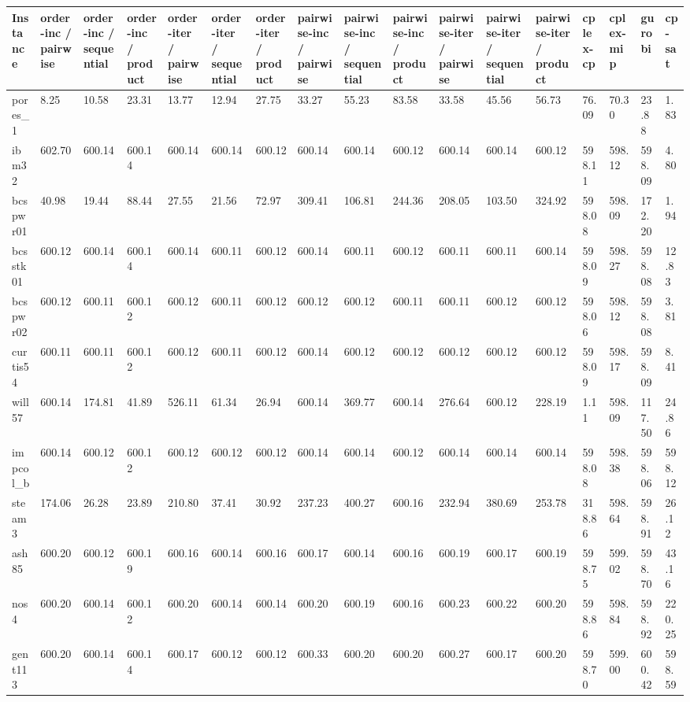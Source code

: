 \begin{tabular}{lllllllllllllllll}
\hline
Instance & order-inc / pairwise & order-inc / sequential & order-inc / product & order-iter / pairwise & order-iter / sequential & order-iter / product & pairwise-inc / pairwise & pairwise-inc / sequential & pairwise-inc / product & pairwise-iter / pairwise & pairwise-iter / sequential & pairwise-iter / product & cplex-cp & cplex-mip & gurobi & cp-sat \\
\hline
pores\_1 & 8.25 & 10.58 & 23.31 & 13.77 & 12.94 & 27.75 & 33.27 & 55.23 & 83.58 & 33.58 & 45.56 & 56.73 & 76.09 & 70.30 & 23.88 & 1.83 \\
ibm32 & 602.70 & 600.14 & 600.14 & 600.14 & 600.14 & 600.12 & 600.14 & 600.14 & 600.12 & 600.14 & 600.14 & 600.12 & 598.11 & 598.12 & 598.09 & 4.80 \\
bcspwr01 & 40.98 & 19.44 & 88.44 & 27.55 & 21.56 & 72.97 & 309.41 & 106.81 & 244.36 & 208.05 & 103.50 & 324.92 & 598.08 & 598.09 & 172.20 & 1.94 \\
bcsstk01 & 600.12 & 600.14 & 600.14 & 600.14 & 600.11 & 600.12 & 600.14 & 600.11 & 600.12 & 600.11 & 600.11 & 600.14 & 598.09 & 598.27 & 598.08 & 12.83 \\
bcspwr02 & 600.12 & 600.11 & 600.12 & 600.12 & 600.11 & 600.12 & 600.12 & 600.12 & 600.11 & 600.11 & 600.12 & 600.12 & 598.06 & 598.12 & 598.08 & 3.81 \\
curtis54 & 600.11 & 600.11 & 600.12 & 600.12 & 600.11 & 600.12 & 600.14 & 600.12 & 600.12 & 600.12 & 600.12 & 600.12 & 598.09 & 598.17 & 598.09 & 8.41 \\
will57 & 600.14 & 174.81 & 41.89 & 526.11 & 61.34 & 26.94 & 600.14 & 369.77 & 600.14 & 276.64 & 600.12 & 228.19 & 1.11 & 598.09 & 117.50 & 24.86 \\
impcol\_b & 600.14 & 600.12 & 600.12 & 600.12 & 600.12 & 600.12 & 600.14 & 600.14 & 600.12 & 600.14 & 600.14 & 600.14 & 598.08 & 598.38 & 598.06 & 598.12 \\
steam3 & 174.06 & 26.28 & 23.89 & 210.80 & 37.41 & 30.92 & 237.23 & 400.27 & 600.16 & 232.94 & 380.69 & 253.78 & 318.86 & 598.64 & 598.91 & 26.12 \\
ash85 & 600.20 & 600.12 & 600.19 & 600.16 & 600.14 & 600.16 & 600.17 & 600.14 & 600.16 & 600.19 & 600.17 & 600.19 & 598.75 & 599.02 & 598.70 & 43.16 \\
nos4 & 600.20 & 600.14 & 600.12 & 600.20 & 600.14 & 600.14 & 600.20 & 600.19 & 600.16 & 600.23 & 600.22 & 600.20 & 598.86 & 598.84 & 598.92 & 220.25 \\
gent113 & 600.20 & 600.14 & 600.14 & 600.17 & 600.12 & 600.12 & 600.33 & 600.20 & 600.20 & 600.27 & 600.17 & 600.20 & 598.70 & 599.00 & 600.42 & 598.59 \\

\end{tabular}
